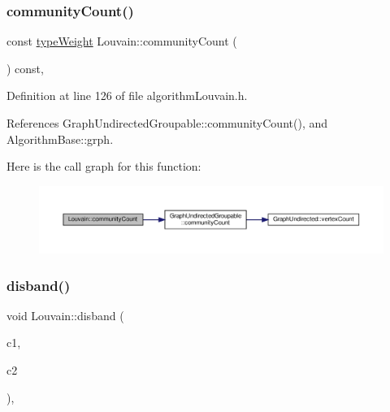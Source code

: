 \subsubsection{\texorpdfstring{community\+Count()}{communityCount()}}
{\footnotesize\ttfamily const \hyperlink{edge_8h_a2e7ea3be891ac8b52f749ec73fee6dd2}{type\+Weight} Louvain\+::community\+Count (\begin{DoxyParamCaption}{ }\end{DoxyParamCaption}) const\hspace{0.3cm}{\ttfamily [inline]}, {\ttfamily [private]}}



Definition at line 126 of file algorithm\+Louvain.\+h.



References Graph\+Undirected\+Groupable\+::community\+Count(), and Algorithm\+Base\+::grph.

Here is the call graph for this function\+:
\nopagebreak
\begin{figure}[H]
\begin{center}
\leavevmode
\includegraphics[width=350pt]{classLouvain_a5e6c5b0c782e1a91c1ac8eccd17d1c3d_cgraph}
\end{center}
\end{figure}
\mbox{\label{classLouvain_a0f6163e6efef09a9c1efd8b9b17f5880}} 
\subsubsection{\texorpdfstring{disband()}{disband()}}
{\footnotesize\ttfamily void Louvain\+::disband (\begin{DoxyParamCaption}\item[{const \hyperlink{graphUndirectedGroupable_8h_a914da95c9ea7f14f4b7f875c36818556}{type\+Community}}]{c1,  }\item[{const \hyperlink{graphUndirectedGroupable_8h_a914da95c9ea7f14f4b7f875c36818556}{type\+Community}}]{c2 }\end{DoxyParamCaption})\hspace{0.3cm}{\ttfamily [inline]}, {\ttfamily [private]}}



